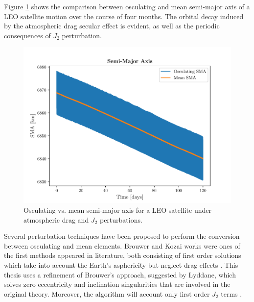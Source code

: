 Figure \ref{osc_vs_mean_sma} shows the comparison between osculating and mean semi-major axis of a LEO satellite motion over the course of four months.
The orbital decay induced by the atmospheric drag secular effect is evident, as well as the periodic consequences of $J_2$ perturbation.
\begin{figure}[h]
    \centering
    \includegraphics[scale=0.9]{img/osc_vs_mean.pdf}
        \caption{Osculating vs. mean semi-major axis for a LEO satellite under atmospheric drag and $J_2$ perturbations.}
    \label{osc_vs_mean_sma}
\end{figure}

Several perturbation techniques have been proposed to perform the conversion between osculating and mean elements. 
Brouwer and Kozai works were ones of the first methods appeared in literature, both consisting of first order solutions which take into account the Earth's asphericity but neglect drag effects \cite{arnas2022analytic}.
This thesis uses a refinement of Brouwer's approach, suggested by Lyddane, which solves zero eccentricity and inclination singularities that are involved in the original theory.
Moreover, the algorithm will account only first order $J_2$ terms \cite{schaub2002analytical}.

